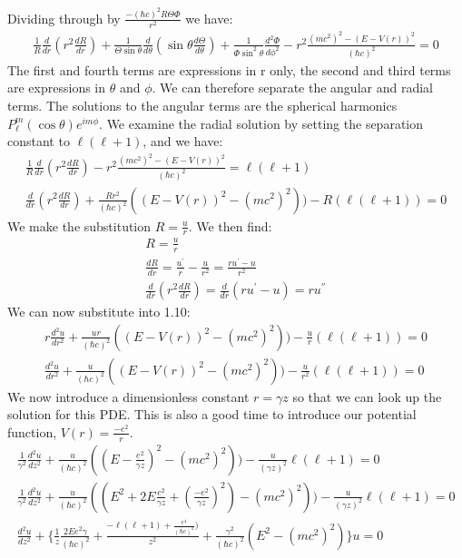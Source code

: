 \documentclass[a4paper,10pt]{article}
\numberwithin{equation}{section}
\begin{document}
Dividing through by $\frac{-(\hbar c)^2R\Theta\Phi}{r^2}$ we have:
\begin{gather}
 \frac{1}{R}\frac{d}{dr}(r^2\frac{dR}{dr})+\frac{1}{\Theta\sin \theta}\frac{d}{d \theta}(\sin \theta \frac{d\Theta}{d \theta})
 +\frac{1}{\Phi \sin ^2 \theta}\frac{d^2\Phi}{d \phi^2}
 -r^2\frac{(mc^2)^2-(E-V(r))^2}{(\hbar c)^2}=0
\end{gather}
The first and fourth terms are expressions in r only, the second and third terms are expressions in $\theta$ and $\phi$.
We can therefore separate the angular and radial terms.
The solutions to the angular terms are the spherical harmonics $P_{\ell}^{m}(\cos \theta)e^{im\phi}$.
We examine the radial solution by setting the separation constant to $\ell(\ell+1)$, and we have:
\begin{gather}
  \frac{1}{R}\frac{d}{dr}(r^2\frac{dR}{dr})-r^2\frac{(mc^2)^2-(E-V(r))^2}{(\hbar c)^2}=\ell(\ell+1)\\
  \frac{d}{dr}(r^2\frac{dR}{dr})+\frac{Rr^2}{(\hbar c)^2}((E-V(r))^2-(mc^2)^2))-R(\ell(\ell+1))=0
\end{gather}
We make the substitution $R=\frac{u}{r}$. We then find:
\begin{gather}
R = \frac{u}{r}\\
\frac{dR}{dr}=\frac{u^{'}}{r}-\frac{u}{r^2}= \frac{ru^{'}-u}{r^2}\\
\frac{d}{dr}(r^2\frac{dR}{dr})=\frac{d}{dr}(ru^{'}-u)=ru^{''}
\end{gather}
We can now substitute into 1.10:
\begin{gather}
 r\frac{d^2u}{dr^2}+\frac{ur}{(\hbar c)^2}((E-V(r))^2-(mc^2)^2))-\frac{u}{r}(\ell(\ell+1))=0\\
 \frac{d^2u}{dr^2}+\frac{u}{(\hbar c)^2}((E-V(r))^2-(mc^2)^2))-\frac{u}{r^2}(\ell(\ell+1))=0
\end{gather}
We now introduce a dimensionless constant $r=\gamma z$ so that we can look up the solution for this PDE.
This is also a good time to introduce our potential function, $V(r) = \frac{-e^2}{r}$.
\begin{gather}
 \frac{1}{\gamma ^2}\frac{d^2u}{dz^2}+\frac{u}{(\hbar c)^2}((E-\frac{e^2}{\gamma z})^2-(mc^2)^2))-\frac{u}{(\gamma z)^2}\ell(\ell+1)=0\\
 \frac{1}{\gamma ^2}\frac{d^2u}{dz^2}+\frac{u}{(\hbar c)^2}((E^2+2E\frac{e^2}{\gamma z}+(\frac{-e^2}{\gamma z})^2   )-(mc^2)^2))-\frac{u}{(\gamma z)^2}\ell(\ell+1)=0\\
 \frac{d^2u}{dz^2}+\{\frac{1}{z}\frac{2Ee^2\gamma}{(\hbar c)^2}+\frac{-\ell(\ell+1)+\frac{e^4}{(\hbar c)^2})}{z^2}+\frac{\gamma^2}{(\hbar c)^2}(E^2-(mc^2)^2) \}u=0
\end{gather}
\end{document}
